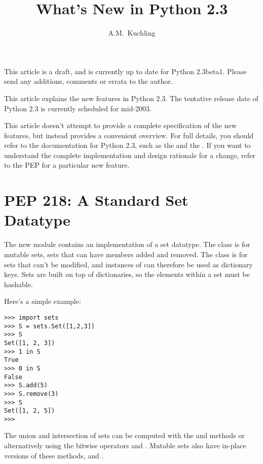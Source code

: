 \documentclass{howto}
\title{What's New in Python 2.3}
\author{A.M.\ Kuchling}
\begin{document}
\maketitle
\tableofcontents



{\large This article is a draft, and is currently up to date for
Python 2.3beta1.  Please send any additions, comments or errata to the
author.}

This article explains the new features in Python 2.3.  The tentative
release date of Python 2.3 is currently scheduled for mid-2003.

This article doesn't attempt to provide a complete specification of
the new features, but instead provides a convenient overview.  For
full details, you should refer to the documentation for Python 2.3,
such as the  and
the .  If you want
to understand the complete implementation and design rationale for a
change, refer to the PEP for a particular new feature.


\section{PEP 218: A Standard Set Datatype}

The new  module contains an implementation of a set
datatype.  The  class is for mutable sets, sets that can
have members added and removed.  The  class is for
sets that can't be modified, and instances of  can
therefore be used as dictionary keys.  Sets are built on top of
dictionaries, so the elements within a set must be hashable.

Here's a simple example:

\begin{verbatim}
>>> import sets
>>> S = sets.Set([1,2,3])
>>> S
Set([1, 2, 3])
>>> 1 in S
True
>>> 0 in S
False
>>> S.add(5)
>>> S.remove(3)
>>> S
Set([1, 2, 5])
>>>
\end{verbatim}

The union and intersection of sets can be computed with the
 and  methods or
alternatively using the bitwise operators \code{\&} and \code{|}.
Mutable sets also have in-place versions of these methods,
 and .
\end{document}
